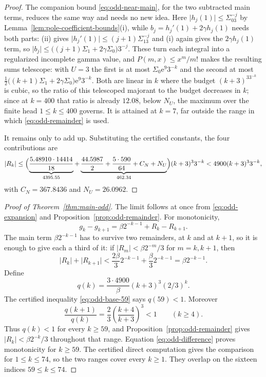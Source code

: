 \documentclass[11pt]{amsart}
\theoremstyle{plain}
\theoremstyle{definition}
\newcommand{\e}{\mathrm e}
\newcommand{\abs}[1]{\lvert #1\rvert}
\begin{document}
\begin{proof}
The companion bound \eqref{eq:odd-near-main}, for the two subtracted main
terms, reduces the same way and needs no new idea. Here
$\abs{h_j(1)}\leq\Sigma_03^{-j}$ by
Lemma~\ref{lem:pole-coefficient-bounds}(i), while $b_j=h_j'(1)+2\gamma h_j(1)$
needs both parts: (ii) gives $\abs{h_j'(1)}\leq(j+1)\Sigma_13^{-j}$ and (i)
again gives the $2\gamma h_j(1)$ term, so
$\abs{b_j}\leq\bigl((j+1)\Sigma_1+2\gamma\Sigma_0\bigr)3^{-j}$. These turn each
integral into a regularized incomplete gamma value, and $P(m,x)\leq x^m/m!$
makes the resulting sums telescope: with $U=3$ the first is at most
$\Sigma_0\e^{9}3^{-k}$ and the second at most
$\tfrac12\bigl((k+1)\Sigma_1+2\gamma\Sigma_0\bigr)\e^{9}3^{-k}$. Both are
linear in $k$ where the budget $(k+3)^33^{-k}$ is cubic, so the ratio of this
telescoped majorant to the budget decreases in $k$; since at $k=400$ that ratio
is already $12.08$, below $N_U$, the maximum over the finite head
$1\leq k\leq400$ governs. It is attained at $k=7$, far outside the range in
which \eqref{eq:odd-remainder} is used.

It remains only to add up. Substituting the certified constants, the four
contributions are
\[
 \abs{R_k}\leq\Bigl(
 \underbrace{\frac{5.48910\cdot14414}{18}}_{4395.55}
 +\underbrace{\frac{44.5987}{2}+\frac{5\cdot590}{64}+C_N+N_U}_{462.34}
 \Bigr)(k+3)^3 3^{-k}<4900(k+3)^3 3^{-k},
\]
with $C_N=367.8436$ and $N_U=26.0962$.
\end{proof}

\begin{proof}[Proof of Theorem~\ref{thm:main-odd}]
The limit follows at once from \eqref{eq:odd-expansion} and
Proposition~\ref{prop:odd-remainder}. For monotonicity,
\begin{equation}\label{eq:odd-difference}
 g_k-g_{k+1}
 =\beta2^{-k-1}+R_k-R_{k+1}.
\end{equation}
The main term $\beta2^{-k-1}$ has to survive two remainders, at $k$ and at
$k+1$, so it is enough to give each a third of it: if
$\abs{R_m}<\beta2^{-m}/3$ for $m=k,k+1$, then
\[
 \abs{R_k}+\abs{R_{k+1}}
 <\frac{2\beta}{3}2^{-k-1}+\frac{\beta}{3}2^{-k-1}
 =\beta2^{-k-1}.
\]
Define
\[
 q(k)=\frac{3\cdot4900}{\beta}(k+3)^3(2/3)^k.
\]
The certified inequality \eqref{eq:odd-base-59} says $q(59)<1$. Moreover
\[
 \frac{q(k+1)}{q(k)}
 =\frac23\left(\frac{k+4}{k+3}\right)^3<1
 \qquad(k\geq4).
\]
Thus $q(k)<1$ for every $k\geq59$, and
Proposition~\ref{prop:odd-remainder} gives
$\abs{R_k}<\beta2^{-k}/3$ throughout that range. Equation
\eqref{eq:odd-difference} proves monotonicity for $k\geq59$. The certified
direct computation gives the comparison for $1\leq k\leq74$, so the two ranges
cover every $k\geq1$. They overlap on the sixteen indices $59\leq k\leq74$.
\end{proof}
\end{document}
